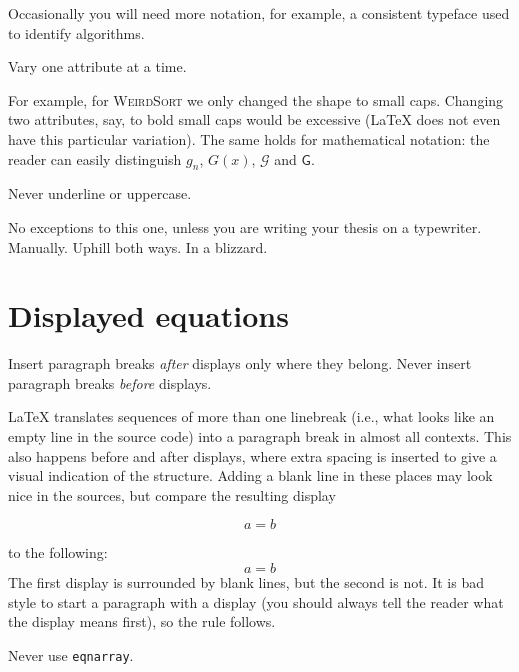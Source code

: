 Occasionally you will need more notation, for example, a consistent
typeface used to identify algorithms.

\begin{Rule}
  Vary one attribute at a time.
\end{Rule}

For example, for \textsc{WeirdSort} we only changed the shape to small
caps.  Changing two attributes, say, to bold small caps would be
excessive (\LaTeX{} does not even have this particular variation).
The same holds for mathematical notation: the reader can easily
distinguish \(g_n\), \(G(x)\), \(\mathcal{G}\) and \(\mathsf{G}\).

\begin{Rule}
  Never underline or uppercase.
\end{Rule}

No exceptions to this one, unless you are writing your thesis on a
typewriter.  Manually.  Uphill both ways.  In a blizzard.

\section{Displayed equations}

\begin{Rule}
  Insert paragraph breaks \emph{after} displays only where they
  belong.  Never insert paragraph breaks \emph{before} displays.
\end{Rule}

\LaTeX{} translates sequences of more than one linebreak (i.e., what
looks like an empty line in the source code) into a paragraph break in
almost all contexts.  This also happens before and after displays,
where extra spacing is inserted to give a visual indication of the
structure.  Adding a blank line in these places may look nice in the
sources, but compare the resulting display

\begin{displaymath}
  a = b
\end{displaymath}

to the following:
\begin{displaymath}
  a = b
\end{displaymath}
The first display is surrounded by blank lines, but the second is not.
It is bad style to start a paragraph with a display (you should always
tell the reader what the display means first), so the rule follows.

\begin{Rule}
  Never use \lstinline-eqnarray-.
\end{Rule}

